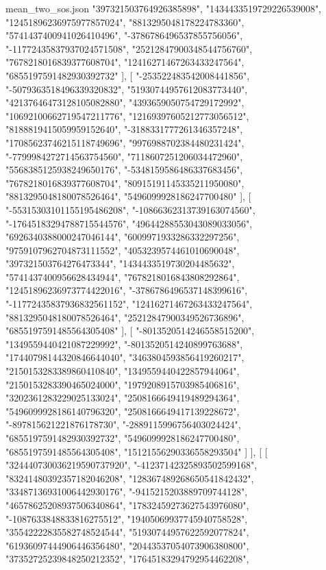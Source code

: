 \begin{filecontents*}[overwrite]{mean_two_sos.json}
    "397321503764926385898",
    "1434433519729226539008",
    "12451896236975977857024",
    "8813295048178224783360",
    "5741437400941026410496",
    "-3786786496537855756056",
    "-11772435837937024571508",
    "25212847900348544756760",
    "7678218016839377608704",
    "12416271467263433247564",
    "6855197591482930392732"
   ],
   [
    "-253522483542008441856",
    "-5079363518496339320832",
    "51930744957612083773440",
    "42137646473128105082880",
    "4393659050754729172992",
    "10692100662719547211776",
    "12169397605212773056512",
    "8188819415059959152640",
    "-3188331777261346357248",
    "17085623746215118749696",
    "9976988702384480231424",
    "-7799984272714563754560",
    "7118607251206034472960",
    "5568385125938249650176",
    "-5348159586486337683456",
    "7678218016839377608704",
    "80915191145335211950080",
    "8813295048180078526464",
    "5496099928186247700480"
   ],
   [
    "-55315303101155195486208",
    "-10866362313739163074560",
    "-17645183294788715544576",
    "49644288553043089033056",
    "6926340388000247046144",
    "6009971933286332297256",
    "9759107962704873111552",
    "4053239574461010690048",
    "397321503764276473344",
    "1434433519730204485632",
    "5741437400956628434944",
    "7678218016843808292864",
    "12451896236973774422016",
    "-3786786496537148399616",
    "-11772435837936832561152",
    "12416271467263433247564",
    "8813295048180078526464",
    "25212847900349526736896",
    "6855197591485564305408"
   ],
   [
    "-8013520514246558515200",
    "1349559440421087229992",
    "-8013520514240899763688",
    "17440798144320846644040",
    "3463804593856419260217",
    "2150153283389860410840",
    "1349559440422857944064",
    "2150153283390465024000",
    "1979208915703985406816",
    "3202361283229025133024",
    "2508166649419489294364",
    "5496099928186140796320",
    "2508166649417139228672",
    "-897815621221876178730",
    "-2889115996756403024424",
    "6855197591482930392732",
    "5496099928186247700480",
    "6855197591485564305408",
    "15121556290336558293504"
   ]
  ],
  [
   [
    "324440730036219590737920",
    "-41237142325893502599168",
    "83241480392357182046208",
    "128367489268650541842432",
    "33487136931006442930176",
    "-9415215203889709744128",
    "46578625208937506340864",
    "17832459273627543976080",
    "-1087633848833816275512",
    "19405069937745940758528",
    "35542222835582748524544",
    "51930744957622592077824",
    "61936097444906446356480",
    "20443537054073906380800",
    "37352725239848250212352",
    "17645183294792954462208",

\end{filecontents*}
